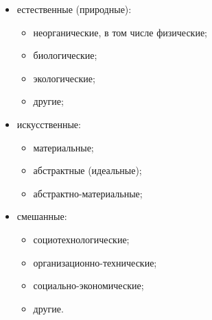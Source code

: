 \begin{itemize}


\item естественные (природные):


\begin{itemize}


\item неорганические, в том числе физические;\\[-14pt]


\item биологические;\\[-14pt]


\item экологические;\\[-14pt]


\item другие;


\end{itemize}


\item искусственные:


\begin{itemize}


\item материальные;\\[-14pt]


\item абстрактные (идеальные);\\[-14pt]


\item абстрактно-материальные;\\[-14pt]


\end{itemize}


\item смешанные:


\begin{itemize}


\item социотехнологические;\\[-14pt]


\item организационно-технические;\\[-14pt]


\item социально-экономические;\\[-14pt]


\item другие.


\end{itemize}


\end{itemize}





